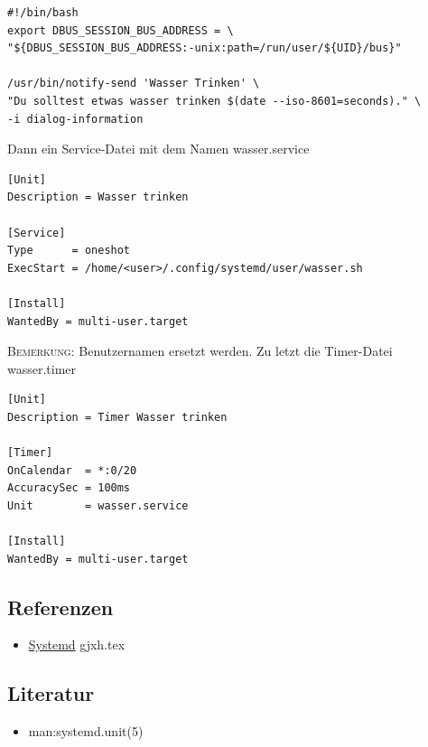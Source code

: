 \documentclass{sajzk}
\begin{document}
\begin{verbatim}
#!/bin/bash
export DBUS_SESSION_BUS_ADDRESS = \
"${DBUS_SESSION_BUS_ADDRESS:-unix:path=/run/user/${UID}/bus}"

/usr/bin/notify-send 'Wasser Trinken' \
"Du solltest etwas wasser trinken $(date --iso-8601=seconds)." \
-i dialog-information
\end{verbatim}
\newpage
Dann ein Service-Datei mit dem Namen wasser.service
\begin{verbatim}
[Unit]
Description = Wasser trinken

[Service]
Type      = oneshot
ExecStart = /home/<user>/.config/systemd/user/wasser.sh

[Install]
WantedBy = multi-user.target
\end{verbatim}
\textsc{Bemerkung:} %
Benutzernamen ersetzt werden.
\newpage
Zu letzt die Timer-Datei wasser.timer
\begin{verbatim}
[Unit]
Description = Timer Wasser trinken

[Timer]
OnCalendar  = *:0/20
AccuracySec = 100ms
Unit        = wasser.service

[Install]
WantedBy = multi-user.target
\end{verbatim}

\subsection{Referenzen}
\begin{itemize}
    \item \href{gjxh.pdf}{Systemd} gjxh.tex
\end{itemize}

\subsection{Literatur}
\begin{itemize}
    \item man:systemd.unit(5)
\end{itemize}
\end{document}
